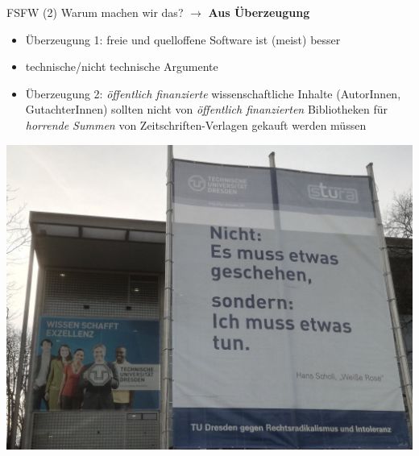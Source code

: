 \documentclass[t]{beamer}
\begin{document}

\begin{frame}[label=ct2]{\color{fg}FSFW (2)}
Warum machen wir das? $\rightarrow$ \textbf{Aus Überzeugung}\\[1cm]
  \begin{itemize}
  \item Überzeugung 1: freie und quelloffene Software ist (meist) besser
  \item[] technische/nicht technische Argumente
  \pause
  \bigskip
  \item Überzeugung 2: \textit{öffentlich finanzierte} wissenschaftliche Inhalte
  (AutorInnen, GutachterInnen) sollten nicht von \textit{öffentlich finanzierten}
  Bibliotheken für \textit{horrende Summen} von Zeitschriften-Verlagen gekauft werden müssen
  \end{itemize}
\end{frame}


\begin{frame}[label=ct3,plain]{}

\vspace{1mm}
\begin{center}
\includegraphics[width=1.05\textwidth]{img-src/tud-ich-muss-etwas-tun}
\end{center}


\end{frame}
\end{document}
